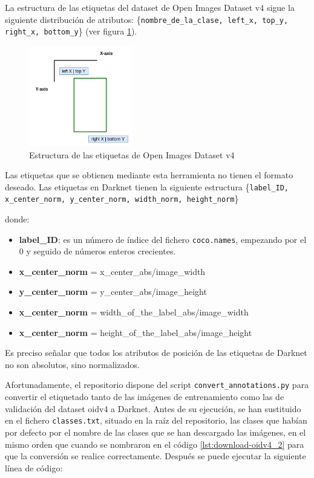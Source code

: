 La estructura de las etiquetas del dataset de Open Images Dataset v4 sigue la siguiente distribución de atributos: \{\texttt{nombre\_de\_la\_clase, left\_x, top\_y, right\_x, bottom\_y}\} (ver figura \ref{fig:bbox-oidv4}).

\begin{figure}[ht]
\centering
\includegraphics[width=0.4\textwidth]{img/chapters/resultados/datasets/bbox-oidv4.png}
\caption{\label{fig:bbox-oidv4}Estructura de las etiquetas de Open Images Dataset v4 \cite{OIDv4_ToolKit}}
\end{figure}

Las etiquetas que se obtienen mediante esta herramienta no tienen el formato deseado. Las etiquetas en Darknet tienen la siguiente estructura \{\texttt{label\_ID, x\_center\_norm, y\_center\_norm, width\_norm, height\_norm}\}

donde:

\begin{itemize}
    \item \textbf{label\_ID}: es un número de índice del fichero \texttt{coco.names}, empezando por el 0 y seguido de números enteros crecientes.
    \item \textbf{x\_center\_norm} = x\_center\_abs/image\_width
    \item \textbf{y\_center\_norm} = y\_center\_abs/image\_height
    \item \textbf{x\_center\_norm} = width\_of\_the\_label\_abs/image\_width
    \item \textbf{x\_center\_norm} = height\_of\_the\_label\_abs/image\_height
\end{itemize}

Es preciso señalar que todos los atributos de posición de las etiquetas de Darknet no son absolutos, sino normalizados.

Afortunadamente, el repositorio \cite{OIDv4_ToolKit} dispone del script \texttt{convert\_annotations.py} para convertir el etiquetado tanto de las imágenes de entrenamiento como las de validación del dataset \gls{oidv4} a Darknet. Antes de su ejecución, se han sustituido en el fichero \texttt{classes.txt}, situado en la raíz del repositorio, las clases que habían por defecto por el nombre de las clases que se han descargado las imágenes, en el mismo orden que cuando se nombraron en el código \ref{lst:download-oidv4_2} para que la conversión se realice correctamente. Después se puede ejecutar la siguiente línea de código:


